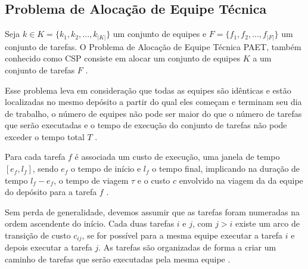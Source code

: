 


\subsection{Problema de Alocação de Equipe Técnica}
Seja $k \in K=\{k_1, k_2, ..., k_{|K|}\}$ um conjunto de equipes e $F = \{f_1, f_2, ..., f_{|F|}\}$ um conjunto de tarefas. O Problema de Alocação de Equipe Técnica \ac{PAET}, também conhecido como \ac{CSP} consiste em alocar um conjunto de equipes $K$ a um conjunto de tarefas $F$ \cite{Beasley:1996}. 

Esse problema leva em consideração que todas as equipes são idênticas e estão localizadas no mesmo depósito a partir do qual eles começam e terminam seu dia de trabalho, o número de equipes não pode ser maior do que o número de tarefas que serão executadas e o tempo de execução do conjunto de tarefas não pode exceder o tempo total $T$ \cite{Beasley:1996}.

Para cada tarefa $f$ é associada um custo de execução, uma janela de tempo $[e_f, l_f]$, sendo $e_f$ o tempo de início e $l_f$ o tempo final, implicando na duração de tempo $l_f - e_f$, o tempo de viagem $\tau$ e o custo $c$ envolvido na viagem da da equipe do depósito para a tarefa $f$ \cite{Beasley:1996}.

Sem perda de generalidade, devemos assumir que as tarefas foram numeradas na ordem ascendente do início. Cada duas tarefas $i$ e $j$, com $j > i$ existe um arco de transição de custo $c_{ij}$, se for possível para a mesma equipe executar a tarefa $i$ e depois executar a tarefa $j$. As tarefas são organizadas de forma a criar um caminho de tarefas que serão executadas pela mesma equipe \cite{Beasley:1996}. 

